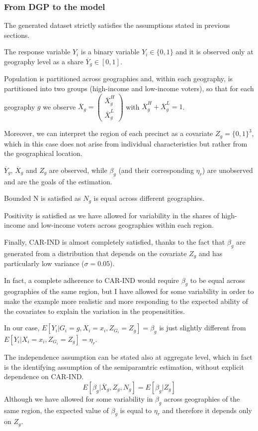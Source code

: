 \subsubsection{From DGP to the model}

The generated dataset strictly satisfies the assumptions stated in previous sections.

The response variable $Y_i$ is a binary variable $Y_i \in \{0,1\}$ and it is observed only at geography level as a share $\overline{Y}_g \in [0,1]$.

Population is partitioned across geographies and, within each geography, is partitioned into two groups (high-income and low-income voters), so that for each geography $g$ we observe $\overline{X}_g = \begin{pmatrix}
    \overline{X}_g^H \\
    \overline{X}_g^L
\end{pmatrix}$ with $\overline{X}_g^H + \overline{X}_g^L = 1$.

Moreover, we can interpret the region of each precinct as a covariate $Z_g = \{0,1\}^3$, which in this case does not arise from individual characteristics but rather from the geographical location.

$\overline{Y}_g$, $\overline{X}_g$ and $Z_g$ are observed, while $\beta_g$ (and their corresponding $\eta_r$) are unobserved and are the goals of the estimation.

Bounded N is satisfied as $N_g$ is equal across different geographies.

Positivity is satisfied as we have allowed for variability in the shares of high-income and low-income voters across geographies within each region.

Finally, CAR-IND is almost completely satisfied, thanks to the fact that $\beta_g$ are generated from a distribution that depends on the covariate $Z_g$ and has particularly low variance ($\sigma = 0.05$).

In fact, a complete adherence to CAR-IND would require $\beta_g$ to be equal across geographies of the same region, but I have allowed for some variability in order to make the example more realistic and more responding to the expected ability of the covariates to explain the variation in the propensitities.

In our case, $E[Y_i | G_i = g, X_i = x_i, Z_{G_i} = Z_g ]  = \beta_g$ is just slightly different from $E[Y_i | X_i = x_i, Z_{G_i} = Z_g ] = \eta_{r}$.

The independence assumption can be stated also at aggregate level, which in fact is the identifying assumption of the semiparamtric estimation, without explicit dependence on CAR-IND.
\[
E[\beta_g | \overline{X}_g, Z_g, N_g] = E[\beta_g | Z_g]
\]
Although we have allowed for some variability in $\beta_g$ across geographies of the same region, the expected value of $\beta_g$ is equal to $\eta_r$ and therefore it depends only on $Z_g$.

